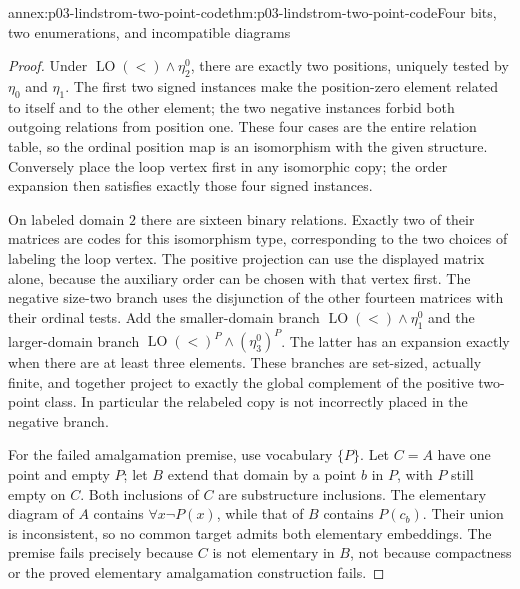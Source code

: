 \begin{annexitem}{annex:p03-lindstrom-two-point-code}{thm:p03-lindstrom-two-point-code}{Four bits, two enumerations, and incompatible diagrams}
\begin{proof}
Under \(\operatorname{LO}(<)\land\eta^0_2\), there are exactly two
positions, uniquely tested by \(\eta_0\) and \(\eta_1\). The first
two signed instances make the position-zero element related to itself
and to the other element; the two negative instances forbid both outgoing
relations from position one. These four cases are the entire relation
table, so the ordinal position map is an isomorphism with the given
structure. Conversely place the loop vertex first in any isomorphic copy;
the order expansion then satisfies exactly those four signed instances.

On labeled domain \(2\) there are sixteen binary relations. Exactly
two of their matrices are codes for this isomorphism type, corresponding
to the two choices of labeling the loop vertex. The positive projection
can use the displayed matrix alone, because the auxiliary order can be
chosen with that vertex first. The negative size-two branch uses the
disjunction of the other fourteen matrices with their ordinal tests.
Add the smaller-domain branch
\(\operatorname{LO}(<)\land\eta^0_1\) and the larger-domain branch
\(\operatorname{LO}(<)^P\land(\eta^0_3)^P\). The latter has an
expansion exactly when there are at least three elements. These branches
are set-sized, actually finite, and together project to exactly the
global complement of the positive two-point class. In particular the
relabeled copy is not incorrectly placed in the negative branch.

For the failed amalgamation premise, use vocabulary \(\{P\}\).
Let \(C=A\) have one point and empty \(P\); let \(B\) extend that
domain by a point \(b\) in \(P\), with \(P\) still empty on \(C\).
Both inclusions of \(C\) are substructure inclusions. The elementary
diagram of \(A\) contains \(\forall x\neg P(x)\), while that of
\(B\) contains \(P(c_b)\). Their union is inconsistent, so no common
target admits both elementary embeddings. The premise fails precisely
because \(C\) is not elementary in \(B\), not because compactness
or the proved elementary amalgamation construction fails.
\end{proof}
\end{annexitem}
